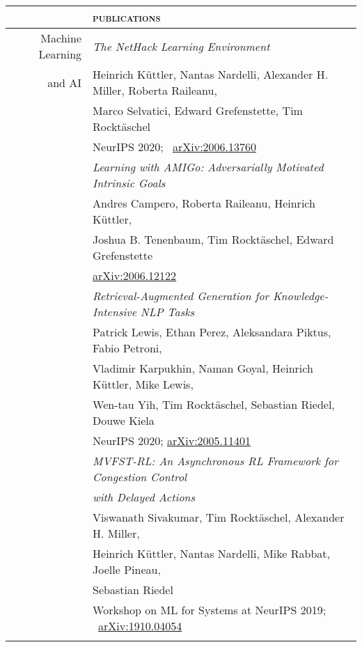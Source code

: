 \documentclass[11pt,english,a4paper]{memoir}
\newcommand{\red}{\color{Maroon}}
\newcommand{\header}[1]{%
  \addlinespace[2ex]
  & \large{\red\textsc{\MakeLowercase{#1}}} \tabularnewline
  \midrule}
\newcommand{\n}{\tabularnewline}
\newcommand{\bull}{\Pisymbol{MinionPro-Extra}{146}~~}
\newcommand{\nobull}{\phantom{\bull}}
\begin{document}
\begin{center}
\begin{tabular}{rl}


  \n
  \header{Publications}
  Machine Learning

  & \textit{The NetHack Learning Environment} \\
  and AI
  & Heinrich Küttler, Nantas Nardelli, Alexander H. Miller, Roberta Raileanu, \\
  & Marco Selvatici, Edward Grefenstette, Tim
  Rocktäschel \\
  & NeurIPS 2020; \ \href{https://arxiv.org/abs/2006.13760}{arXiv:2006.13760}
  \n \addlinespace

  & \textit{Learning with AMIGo: Adversarially Motivated Intrinsic Goals} \\
  & Andres Campero, Roberta Raileanu, Heinrich Küttler, \\
  & Joshua B. Tenenbaum, Tim Rocktäschel, Edward Grefenstette \\
  & \href{https://arxiv.org/abs/2006.12122}{arXiv:2006.12122}
  \n \addlinespace

  & \textit{Retrieval-Augmented Generation for Knowledge-Intensive NLP Tasks} \\
  & Patrick Lewis, Ethan Perez, Aleksandara Piktus, Fabio Petroni, \\
  & Vladimir Karpukhin, Naman Goyal, Heinrich Küttler, Mike Lewis, \\
  & Wen-tau Yih, Tim Rocktäschel, Sebastian Riedel, Douwe Kiela \\
  & NeurIPS 2020; \href{https://arxiv.org/abs/2005.11401}{arXiv:2005.11401}
  \n \addlinespace

  & \textit{MVFST-RL: An Asynchronous RL Framework for Congestion
    Control} \\
  & \textit{with Delayed Actions} \\
  & Viswanath Sivakumar, Tim Rocktäschel, Alexander H. Miller, \\
  & Heinrich Küttler, Nantas Nardelli, Mike Rabbat, Joelle Pineau, \\
  & Sebastian Riedel \\
  & Workshop on ML for Systems at NeurIPS 2019; \ \href{https://arxiv.org/abs/1910.04054}{arXiv:1910.04054}
  \n \addlinespace


\end{tabular}
\end{center}
\end{document}
